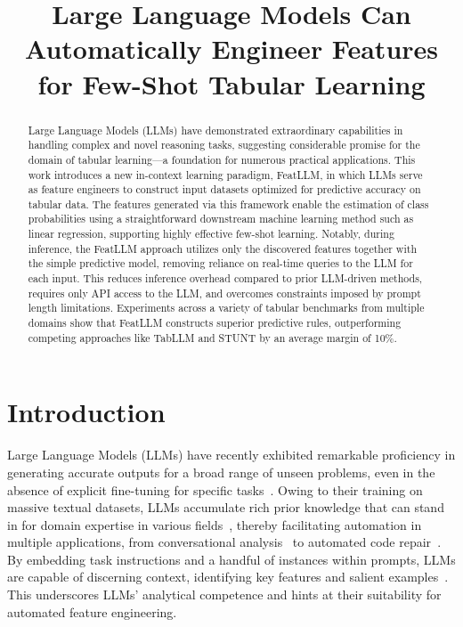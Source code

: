 \title{Large Language Models Can Automatically Engineer Features for Few-Shot Tabular Learning}

\begin{abstract}
Large Language Models (LLMs) have demonstrated extraordinary capabilities in handling complex and novel reasoning tasks, suggesting considerable promise for the domain of tabular learning—a foundation for numerous practical applications. This work introduces a new in-context learning paradigm, \textsf{FeatLLM}, in which LLMs serve as feature engineers to construct input datasets optimized for predictive accuracy on tabular data. The features generated via this framework enable the estimation of class probabilities using a straightforward downstream machine learning method such as linear regression, supporting highly effective few-shot learning. Notably, during inference, the \textsf{FeatLLM} approach utilizes only the discovered features together with the simple predictive model, removing reliance on real-time queries to the LLM for each input. This reduces inference overhead compared to prior LLM-driven methods, requires only API access to the LLM, and overcomes constraints imposed by prompt length limitations. Experiments across a variety of tabular benchmarks from multiple domains show that \textsf{FeatLLM} constructs superior predictive rules, outperforming competing approaches like TabLLM and STUNT by an average margin of 10\%.
\end{abstract}

\section{Introduction}
Large Language Models (LLMs) have recently exhibited remarkable proficiency in generating accurate outputs for a broad range of unseen problems, even in the absence of explicit fine-tuning for specific tasks~\cite{creswell2022selection,imani2023mathprompter,taylor2022galactica}. Owing to their training on massive textual datasets, LLMs accumulate rich prior knowledge that can stand in for domain expertise in various fields~\cite{Genomes2021,singhal2023large,wilcox2003role}, thereby facilitating automation in multiple applications, from conversational analysis~\cite{finch2023leveraging} to automated code repair~\cite{fan2023automated}. By embedding task instructions and a handful of instances within prompts, LLMs are capable of discerning context, identifying key features and salient examples~\cite{brown2020language,zhao2023survey}. This underscores LLMs’ analytical competence and hints at their suitability for automated feature engineering.

